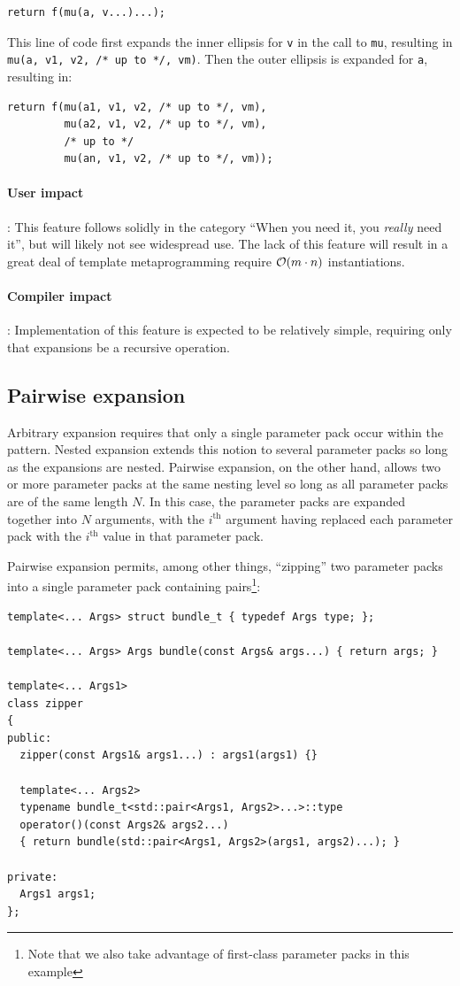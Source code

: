 \documentclass{article}
\begin{document}
\begin{verbatim}
return f(mu(a, v...)...);
\end{verbatim}

This line of code first expands the inner ellipsis for \texttt{v} in
the call to \texttt{mu}, resulting in \texttt{mu(a, v1, v2, /* up to
  */, vm)}. Then the outer ellipsis is expanded for \texttt{a},
resulting in:
\begin{verbatim}
return f(mu(a1, v1, v2, /* up to */, vm),
         mu(a2, v1, v2, /* up to */, vm),
         /* up to */
         mu(an, v1, v2, /* up to */, vm));
\end{verbatim}

\paragraph{User impact}: This feature follows solidly in the category
``When you need it, you \textit{really} need it'', but will likely not
see widespread use. The lack of this feature will result in a great deal
of template metaprogramming require ${\cal O}(m \cdot n)$ instantiations.

\paragraph{Compiler impact}: Implementation of this feature is
expected to be relatively simple, requiring only that expansions be a
recursive operation.

\subsection{Pairwise expansion}
Arbitrary expansion requires that only a single parameter pack occur
within the pattern. Nested expansion extends this notion to several
parameter packs so long as the expansions are nested. Pairwise
expansion, on the other hand, allows two or more parameter packs at
the same nesting level so long as all parameter packs are of the same
length $N$. In this case, the parameter packs are expanded together
into $N$ arguments, with the $i^{\text{th}}$ argument having replaced
each parameter pack with the $i^{\text{th}}$ value in that parameter
pack.

Pairwise expansion permits, among other things, ``zipping'' two
parameter packs into a single parameter pack containing
pairs\footnote{Note that we also take advantage of first-class
  parameter packs in this example}:

\begin{verbatim}
template<... Args> struct bundle_t { typedef Args type; };

template<... Args> Args bundle(const Args& args...) { return args; }

template<... Args1>
class zipper
{
public:
  zipper(const Args1& args1...) : args1(args1) {}

  template<... Args2>
  typename bundle_t<std::pair<Args1, Args2>...>::type
  operator()(const Args2& args2...)
  { return bundle(std::pair<Args1, Args2>(args1, args2)...); }

private:
  Args1 args1;
};
\end{verbatim}
\end{document}
